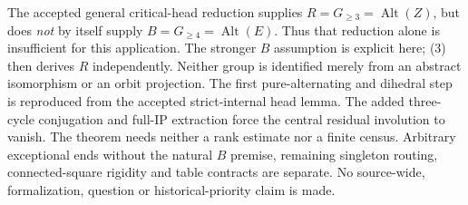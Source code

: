 \documentclass[11pt,a4paper]{article}
\newcommand{\Alt}{\operatorname{Alt}}
\begin{document}
The accepted general critical-head reduction supplies
$R=G_{\ge3}=\Alt(Z)$, but does \emph{not} by itself supply
$B=G_{\ge4}=\Alt(E)$. Thus that reduction alone is insufficient
for this application. The stronger $B$ assumption is explicit here;
(3) then derives $R$ independently. Neither group is identified
merely from an abstract isomorphism or an orbit projection.
The first pure-alternating and dihedral step is reproduced from the
accepted strict-internal head lemma. The added three-cycle conjugation
and full-IP extraction force the central residual involution to vanish.
The theorem needs neither a rank estimate nor a finite census.
Arbitrary exceptional ends without the natural $B$ premise,
remaining singleton routing, connected-square rigidity and table
contracts are separate. No source-wide, formalization, question or
historical-priority claim is made.
\end{document}
